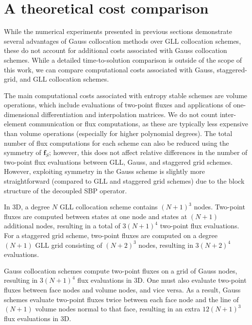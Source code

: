 \documentclass[review,onefignum,onetabnum,final]{siamart171218}
\begin{document}
\section{A theoretical cost comparison}

While the numerical experiments presented in previous sections demonstrate several advantages of Gauss collocation methods over GLL collocation schemes, these do not account for additional costs associated with Gauss collocation schemes.  While a detailed time-to-solution comparison is outside of the scope of this work, we can compare computational costs associated with Gauss, staggered-grid, and GLL collocation schemes.  

The main computational costs associated with entropy stable schemes are volume operations, which include evaluations of two-point fluxes and applications of one-dimensional differentiation and interpolation matrices.  We do not count inter-element communication or flux computations, as these are typically less expensive than volume operations (especially for higher polynomial degrees).  The total number of flux computations for each scheme can also be reduced using the symmetry of $\bm{f}_S$; however, this does not affect relative differences in the number of two-point flux evaluations between GLL, Gauss, and staggered grid schemes.  However, exploiting symmetry in the Gauss scheme is slightly more straightforward (compared to GLL and staggered grid schemes) due to the block structure of the decoupled SBP operator.

In 3D, a degree $N$ GLL collocation scheme contains $(N+1)^3$ nodes.  Two-point fluxes are computed between states at one node and states at $(N+1)$ additional nodes, resulting in a total of $3(N+1)^4$ two-point flux evaluations.  For a staggered grid scheme, two-point fluxes are computed on a degree $(N+1)$ GLL grid consisting of $(N+2)^3$ nodes, resulting in $3(N+2)^4$ evaluations.  

Gauss collocation schemes compute two-point fluxes on a grid of Gauss nodes, resulting in $3(N+1)^4$ flux evaluations in 3D.  One must also evaluate two-point fluxes between face nodes and volume nodes, and vice versa.  As a result, Gauss schemes evaluate two-point fluxes twice between each face node and the line of $(N+1)$ volume nodes normal to that face, resulting in an extra $12(N+1)^3$ flux evaluations in 3D.  %
\end{document}
